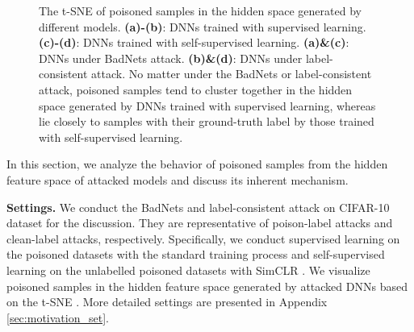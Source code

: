 \begin{figure}[ht]
\centering
\vspace{-3em}
\vspace{-0.8em}
\vspace{-0.8em}
\vspace{0.3em}
\vspace{0.3em}
\caption{The t-SNE of poisoned samples in the hidden space generated by different models. \textbf{(a)-(b)}: DNNs trained with supervised learning. \textbf{(c)-(d)}: DNNs trained with self-supervised learning. \textbf{(a)\&(c)}: DNNs under BadNets attack. \textbf{(b)\&(d)}: DNNs under label-consistent attack. No matter under the BadNets or label-consistent attack, poisoned samples tend to cluster together in the hidden space generated by DNNs trained with supervised learning, whereas lie closely to samples with their ground-truth label by those trained with self-supervised learning.}
\label{fig:motivation}
\vspace{-1.5em}
\end{figure}

In this section, we analyze the behavior of poisoned samples from the hidden feature space of attacked models and discuss its inherent mechanism.

\noindent \textbf{Settings.} 
We conduct the BadNets \citep{gu2017badnets} and label-consistent attack \citep{turner2019label} on CIFAR-10 dataset \citep{krizhevsky2009learning} for the discussion. They are representative of poison-label attacks and clean-label attacks, respectively. Specifically, we conduct supervised learning on the poisoned datasets with the standard training process and self-supervised learning on the unlabelled poisoned datasets with SimCLR \citep{chen2020simple}. We visualize poisoned samples in the hidden feature space generated by attacked DNNs based on the t-SNE \citep{van2008visualizing}. More detailed settings are presented in Appendix \ref{sec:motivation_set}.


